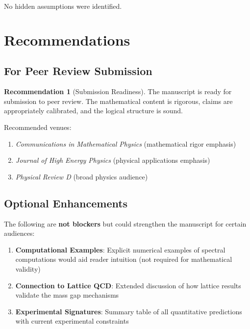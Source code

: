 \documentclass[11pt,a4paper]{article}
\theoremstyle{definition}
\newtheorem{recommendation}{Recommendation}
\begin{document}
No hidden assumptions were identified.

\section{Recommendations}

\subsection{For Peer Review Submission}

\begin{recommendation}[Submission Readiness]
The manuscript is ready for submission to peer review. The mathematical content is rigorous, claims are appropriately calibrated, and the logical structure is sound.

Recommended venues:
\begin{enumerate}
    \item \textit{Communications in Mathematical Physics} (mathematical rigor emphasis)
    \item \textit{Journal of High Energy Physics} (physical applications emphasis)
    \item \textit{Physical Review D} (broad physics audience)
\end{enumerate}
\end{recommendation}

\subsection{Optional Enhancements}

The following are \textbf{not blockers} but could strengthen the manuscript for certain audiences:

\begin{enumerate}
    \item \textbf{Computational Examples}: Explicit numerical examples of spectral computations would aid reader intuition (not required for mathematical validity)

    \item \textbf{Connection to Lattice QCD}: Extended discussion of how lattice results validate the mass gap mechanisms

    \item \textbf{Experimental Signatures}: Summary table of all quantitative predictions with current experimental constraints
\end{enumerate}
\end{document}
